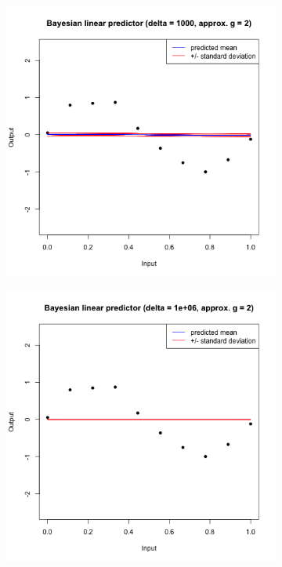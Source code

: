 \documentclass[a4paper, 11pt]{article}
\begin{document}
\begin{figure}[H]
\centering
\begin{subfigure}{.5\textwidth}
  \centering
  \includegraphics[width=1\linewidth]{ps3F_plot12.png}
\end{subfigure}%
\begin{subfigure}{.5\textwidth}
  \centering
  \includegraphics[width=1\linewidth]{ps3F_plot13.png}
\end{subfigure}
\end{figure}
\end{document}
